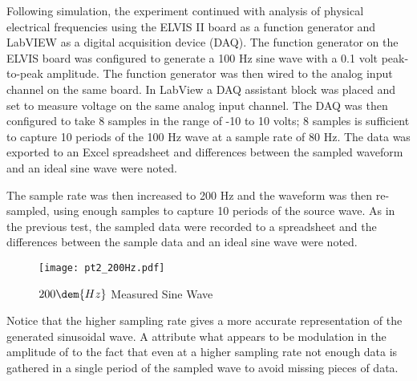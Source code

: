 \documentclass[main.tex]{subfile}
\begin{document}
Following simulation, the experiment continued with analysis of physical
electrical frequencies using the ELVIS II board as a function generator and
LabVIEW as a digital acquisition device (DAQ). The function generator on the
ELVIS board was configured to generate a 100 Hz sine wave with a 0.1 volt
peak-to-peak amplitude. The function generator was then wired to the analog
input channel on the same board. In LabView a DAQ assistant block was placed
and set to measure voltage on the same analog input channel. The DAQ was then
configured to take 8 samples in the range of -10 to 10 volts; 8 samples is
sufficient to capture 10 periods of the 100 Hz wave at a sample rate of 80 Hz.
The data was exported to an Excel spreadsheet and differences between the
sampled waveform and an ideal sine wave were noted.  

The sample rate was then increased to 200 Hz and the waveform was then
re-sampled, using enough samples to capture 10 periods of the source wave. As in
the previous test, the sampled data were recorded to a spreadsheet and the
differences between the sample data and an ideal sine wave were noted.

\begin{figure}[H]
  \begin{center}
    \texttt{[image: pt2\_200Hz.pdf]}
  \end{center}
  \caption{$200\dem{Hz}$ Measured Sine Wave}
  \label{fig:pt280hz}
\end{figure}

Notice that the higher sampling rate gives a more accurate representation of the
generated sinusoidal wave. A attribute what appears to be modulation in the amplitude
of  to the fact that even at a higher sampling rate not enough
data is gathered in a single period of the sampled wave to avoid missing pieces
of data.
\end{document}
